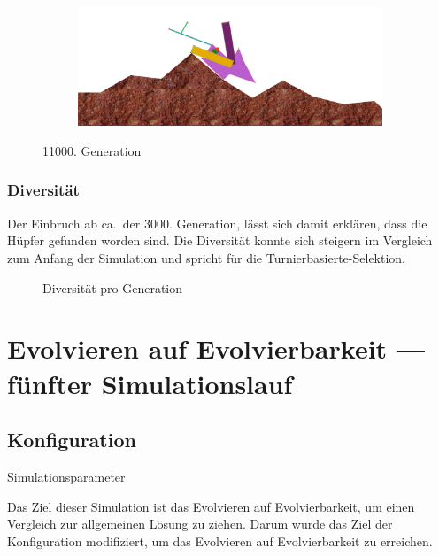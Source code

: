 \begin{figure}[H]
\begin{subfigure}[b]{0.45\textwidth}
            \includegraphics[width=\linewidth,center]{graphics/simulation-results/4_gen11000_4}
            \caption{\label{fig:gen11000_4}}
          \end{subfigure}
          \caption{11000. Generation\label{fig:gen11000}}
        \end{figure}

      \subsubsection{Diversität}

        Der Einbruch ab ca.\ der 3000. Generation, lässt sich damit erklären, dass die Hüpfer gefunden worden sind.
        Die Diversität konnte sich steigern im Vergleich zum Anfang der Simulation und
        spricht für die Turnierbasierte-Selektion.

        \begin{figure}[H]
          \centering
          
          \caption{Diversität pro Generation\label{fig:graphDivFourth}}
        \end{figure}

  \section{Evolvieren auf Evolvierbarkeit --- fünfter Simulationslauf\label{sec:5lauf}}

    \subsection{Konfiguration}

      \begin{table}[H]
        \centering
        
        \caption{Simulationsparameter}
      \end{table}

      Das Ziel dieser Simulation ist das Evolvieren auf Evolvierbarkeit,
      um einen Vergleich zur allgemeinen Lösung zu ziehen.
      Darum wurde das Ziel der Konfiguration modifiziert, um das Evolvieren auf Evolvierbarkeit zu erreichen.

